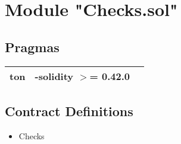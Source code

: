 
\section{Module "Checks.sol"}


\subsection{Pragmas}


\noindent\begin{tabular}{|l|l|p{5cm}|}\hline
ton & -solidity $>$= 0.42.0 &\\\hline
\end{tabular}


\subsection{Contract Definitions}

\begin{itemize}
\item Checks
\end{itemize}
